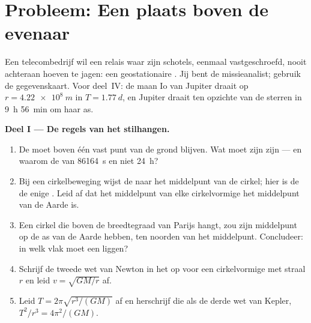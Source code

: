 \section{Probleem: Een plaats boven de evenaar}

\begin{problem}
\label{pb:g12:satellites-kepler:1}
Een telecombedrijf wil een relais waar zijn schotels, eenmaal vastgeschroefd,
nooit achteraan hoeven te jagen: een geostationaire . Jij bent de
missieanalist; gebruik de gegevenskaart. Voor deel~IV: de maan Io van Jupiter
draait op $r = \qty{4.22e8}{m}$ in $T = \qty{1.77}{d}$, en Jupiter draait ten
opzichte van de sterren in \qty{9}{h} \qty{56}{min} om haar as.

\medskip
\noindent\textbf{Deel I --- De regels van het stilhangen.}
\begin{enumerate}
  \item De  moet boven één vast punt van de grond blijven. Wat moet
        zijn  zijn --- en waarom de  van
        \qty{86164}{s} en niet \qty{24}{h}?
  \item Bij een cirkelbeweging wijst de  naar het
        middelpunt van de cirkel; hier is de  de enige . Leid
        af dat het middelpunt van elke cirkelvormige  het
        middelpunt van de Aarde is.
  \item Een cirkel die boven de breedtegraad van Parijs hangt, zou zijn
        middelpunt op de as van de Aarde hebben, ten noorden van het
        middelpunt. Concludeer: in welk vlak moet een 
        liggen?
  \item Schrijf de tweede wet van Newton in het  op voor een
        cirkelvormige  met straal $r$ en leid $v = \sqrt{GM/r}$ af.
  \item Leid $T = 2\pi\sqrt{r^3/(GM)}$ af en herschrijf die als de derde wet
        van Kepler, $T^2/r^3 = 4\pi^2/(GM)$.
\end{enumerate}


\end{problem}
